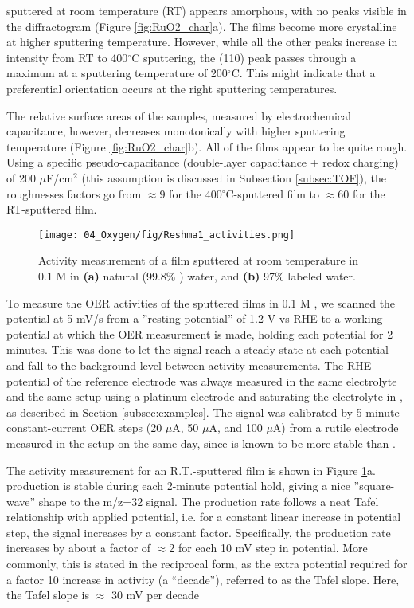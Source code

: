  sputtered at room temperature (RT) appears amorphous, with no peaks visible in the diffractogram (Figure \ref{fig:RuO2_char}a). The films become more crystalline at higher sputtering temperature. However, while all the other peaks increase in intensity from RT to 400$^\circ$C sputtering, the (110) peak passes through a maximum at a sputtering temperature of 200$^\circ$C. This might indicate that a preferential orientation occurs at the right sputtering temperatures.

The relative surface areas of the samples, measured by electrochemical capacitance, however, decreases monotonically with higher sputtering temperature (Figure \ref{fig:RuO2_char}b). All of the films appear to be quite rough. Using a specific pseudo-capacitance (double-layer capacitance + redox charging) of 200 $\mu$F/cm$^2$ (this assumption is discussed in Subsection \ref{subsec:TOF})\cite{Yoshida2013}, the roughnesses factors go from $\approx$9 for the 400$^\circ$C-sputtered film to $\approx$60 for the RT-sputtered film. %

\begin{figure}[h!]
	\texttt{[image: 04\_Oxygen/fig/Reshma1\_activities.png]}
	\caption{Activity measurement of a  film sputtered at room temperature in 0.1 M  in \textbf{(a)} natural (99.8\% ) water, and \textbf{(b)} 97\%  labeled water.}
	\label{fig:Reshma1_activities}
\end{figure}


To measure the OER activities of the sputtered films in 0.1 M , we scanned the potential at 5 mV/s from a ''resting potential'' of 1.2 V vs RHE to a working potential at which the OER measurement is made, holding each potential for 2 minutes. This was done to let the  signal reach a steady state at each potential and fall to the background level between activity measurements. The RHE potential of the reference electrode was always measured in the same electrolyte and the same setup using a platinum electrode and saturating the electrolyte in , as described in Section \ref{subsec:examples}. The  signal was calibrated by 5-minute constant-current OER steps (20 $\mu$A, 50 $\mu$A, and 100 $\mu$A) from a rutile  electrode measured in the setup on the same day, since  is known to be more stable than \cite{Reier2017}.

The activity measurement for an R.T.-sputtered film is shown in Figure \ref{fig:Reshma1_activities}a.  production is stable during each 2-minute potential hold, giving a nice ''square-wave'' shape to the m/z=32 signal. The  production rate follows a neat Tafel relationship with applied potential, i.e. for a constant linear increase in potential step, the  signal increases by a constant factor. Specifically, the  production rate increases by about a factor of $\approx$2 for each 10 mV step in potential. More commonly, this is stated in the reciprocal form, as the extra potential required for a factor 10 increase in activity (a ``decade''), referred to as the Tafel slope. Here, the Tafel slope is $\approx$ 30 mV per decade

